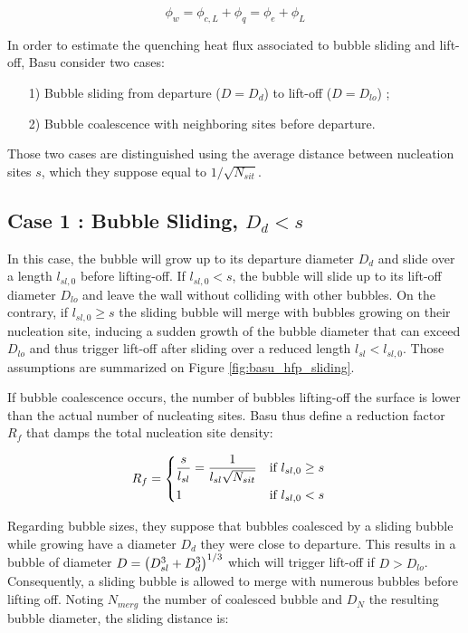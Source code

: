 \begin{equation}
\phi_{w} = \phi_{c,L}+\phi_{q} = \phi_{e} + \phi_{L}
\label{eq:basu_hfp_phitot}
\end{equation}

In order to estimate the quenching heat flux associated to bubble sliding and lift-off, Basu \etal consider two cases: 

\begin{itemize}
\item[1)] Bubble sliding from departure ($D=D_{d}$) to lift-off ($D=D_{lo}$) ;
\item[2)] Bubble coalescence with neighboring sites before departure.
\end{itemize} 

Those two cases are distinguished using the average distance between nucleation sites $s$, which they suppose equal to $1/\sqrt{N_{sit}}$.

\subsection{Case 1 : Bubble Sliding, $D_{d}<s$}

In this case, the bubble will grow up to its departure diameter $D_{d}$ and slide over a length $l_{sl,0}$ before lifting-off. If $l_{sl,0}<s$, the bubble will slide up to its lift-off diameter $D_{lo}$ and leave the wall without colliding with other bubbles. On the contrary, if $l_{sl,0}\geq s$ the sliding bubble will merge with bubbles growing on their nucleation site, inducing a sudden growth of the bubble diameter that can exceed $D_{lo}$ and thus trigger lift-off after sliding over a reduced length $l_{sl}<l_{sl,0}$. Those assumptions are summarized on Figure \ref{fig:basu_hfp_sliding}.

\npar
If bubble coalescence occurs, the number of bubbles lifting-off the surface is lower than the actual number of nucleating sites. Basu \etal thus define a reduction factor $R_{f}$ that damps the total nucleation site density:

\begin{align}
R_{f}&=
\begin{dcases}
\dfrac{s}{l_{sl}} = \dfrac{1}{l_{sl}\sqrt{N_{sit}}} & \text{if } l_{sl,0} \geq s \\
1 & \text{if } l_{sl,0}<s
\end{dcases}
\label{eq:basu_hfp_Rf}
\end{align}  


Regarding bubble sizes, they suppose that bubbles coalesced by a sliding bubble while growing have a diameter $D_{d}$ \ie they were close to departure. %
This results in a bubble of diameter $D=\left( D_{sl}^{3} + D_{d}^{3} \right)^{1/3}$ which will trigger lift-off if $D>D_{lo}$. Consequently, a sliding bubble is allowed to merge with numerous bubbles before lifting off. Noting $N_{merg}$ the number of coalesced bubble and $D_{N}$ the resulting bubble diameter, the sliding distance is:

